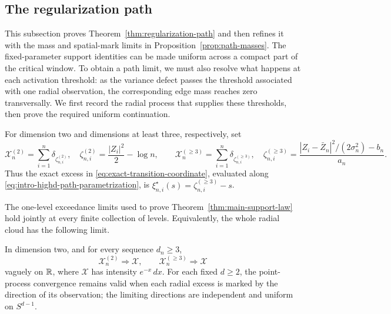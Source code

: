 \subsection{The regularization path}
\label{sec:regularization-path}

This subsection proves Theorem~\ref{thm:regularization-path} and then refines
it with the mass and spatial-mark limits in
Proposition~\ref{prop:path-masses}. The fixed-parameter support identities can
be made uniform across a compact part of the critical window. To obtain a path
limit, we must also resolve what happens at each activation threshold: as the
variance defect passes the threshold associated with one radial observation,
the corresponding edge mass reaches zero transversally. We first record the
radial process that supplies these thresholds, then prove the required uniform
continuation.

For dimension two and dimensions at least three, respectively, set
\begin{equation}
\label{eq:path-radial-processes}
 \mathcal X_n^{(2)}
 =\sum_{i=1}^n\delta_{\zeta_{n,i}^{(2)}},
 \quad
 \zeta_{n,i}^{(2)}=\frac{|Z_i|^2}{2}-\log n,
 \qquad
 \mathcal X_n^{(\ge3)}
 =\sum_{i=1}^n\delta_{\zeta_{n,i}^{(\ge3)}},
 \quad
 \zeta_{n,i}^{(\ge3)}
 =\frac{|Z_i-\bar Z_n|^2/(2\sigma_n^2)-b_n}{a_n}.
\end{equation}
Thus the exact excess in \eqref{eq:exact-transition-coordinate}, evaluated
along \eqref{eq:intro-highd-path-parametrization}, is
\(\xi_{n,i}^\star(s)=\zeta_{n,i}^{(\ge3)}-s\).

The one-level exceedance limits used to prove
Theorem~\ref{thm:main-support-law} hold jointly at every finite collection of
levels. Equivalently, the whole radial cloud has the following limit.

\begin{proposition}
\label{prop:path-radial-process}
In dimension two, and for every sequence \(d_n\ge3\),
\begin{equation}
\label{eq:path-radial-ppp}
 \mathcal X_n^{(2)}\Longrightarrow\mathcal X,
 \qquad
 \mathcal X_n^{(\ge3)}\Longrightarrow\mathcal X
\end{equation}
vaguely on \(\mathbb R\), where \(\mathcal X\) has intensity \(e^{-x}\,dx\).
For each fixed \(d\ge2\), the point-process convergence remains valid when
each radial excess is marked by the direction of its observation; the
limiting directions are independent and uniform on \(S^{d-1}\).
\end{proposition}

